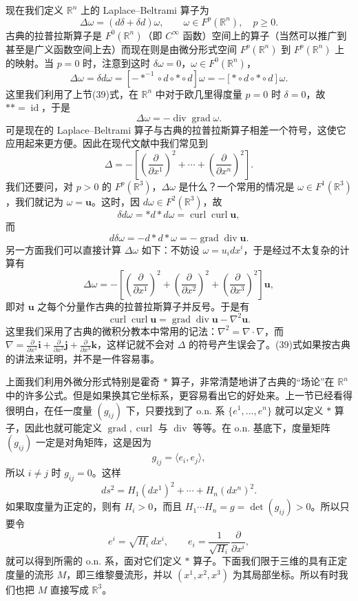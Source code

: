 现在我们定义 $\mathbb R^n$ 上的 Laplace--Beltrami 算子为
\begin{equation}
 \Delta\omega=(d\delta+\delta d)\omega,
 \qquad \omega\in F^p(\mathbb R^n),\quad p\ge0.
 \tag{38}
\end{equation}
古典的拉普拉斯算子是 $F^0(\mathbb R^n)$（即 $C^\infty$ 函数）空间上的算子（当然可以推广到甚至是广义函数空间上去）而现在则是由微分形式空间 $F^p(\mathbb R^n)$ 到 $F^p(\mathbb R^n)$ 上的映射。当 $p=0$ 时，注意到这时 $\delta\omega=0$，$\omega\in F^0(\mathbb R^n)$，
\[
 \Delta\omega=\delta d\omega=[-*^{-1}\circ d\circ *\circ d]\omega=-[*\circ d\circ *\circ d]\omega.
\]
这里我们利用了上节(39)式，在 $\mathbb R^n$ 中对于欧几里得度量 $p=0$ 时 $\delta=0$，故 $**=\operatorname{id}$，于是
\[
 \Delta\omega=-\operatorname{div}\operatorname{grad}\omega.
\]
可是现在的 Laplace--Beltrami 算子与古典的拉普拉斯算子相差一个符号，这使它应用起来更方便。因此在现代文献中我们常见到
\[
 \Delta=-\left[\left(\frac{\partial}{\partial x^1}\right)^2+\cdots+\left(\frac{\partial}{\partial x^n}\right)^2\right].
\]
我们还要问，对 $p>0$ 的 $F^p(\mathbb R^3)$，$\Delta\omega$ 是什么？一个常用的情况是 $\omega\in F^1(\mathbb R^3)$，我们就记为 $\omega=\mathbf u$。这时，因 $d\omega\in F^2(\mathbb R^3)$，故
\[
 \delta d\omega=*d*d\omega=\operatorname{curl}\operatorname{curl}\mathbf u,
\]
而
\[
 d\delta\omega=-d*d*\omega=-\operatorname{grad}\operatorname{div}\mathbf u.
\]
另一方面我们可以直接计算 $\Delta\omega$ 如下：不妨设 $\omega=u_i dx^i$，于是经过不太复杂的计算有
\[
 \Delta\omega=-\left[\left(\frac{\partial}{\partial x^1}\right)^2+\left(\frac{\partial}{\partial x^2}\right)^2+\left(\frac{\partial}{\partial x^3}\right)^2\right]\mathbf u,
\]
即对 $\mathbf u$ 之每个分量作古典的拉普拉斯算子并反号。于是有
\begin{equation}
 \operatorname{curl}\operatorname{curl}\mathbf u
 =\operatorname{grad}\operatorname{div}\mathbf u-\nabla^2\mathbf u.
 \tag{39}
\end{equation}
这里我们采用了古典的微积分教本中常用的记法：$\nabla^2=\nabla\cdot\nabla$，而 $\nabla=\frac{\partial}{\partial x^1}\mathbf i+\frac{\partial}{\partial x^2}\mathbf j+\frac{\partial}{\partial x^3}\mathbf k$，这样记就不会对 $\Delta$ 的符号产生误会了。(39)式如果按古典的讲法来证明，并不是一件容易事。

上面我们利用外微分形式特别是霍奇 $*$ 算子，非常清楚地讲了古典的“场论”在 $\mathbb R^n$ 中的许多公式。但是如果换其它坐标系，更容易看出它的好处来。上一节已经看得很明白，在任一度量 $(g_{ij})$ 下，只要找到了 o.n. 系 $\{e^1,\ldots,e^n\}$ 就可以定义 $*$ 算子，因此也就可能定义 $\operatorname{grad},\operatorname{curl}$ 与 $\operatorname{div}$ 等等。在 o.n. 基底下，度量矩阵 $(g_{ij})$ 一定是对角矩阵，这是因为
\[
 g_{ij}=\langle e_i,e_j\rangle,
\]
所以 $i\ne j$ 时 $g_{ij}=0$。这样
\begin{equation}
 ds^2=H_1(dx^1)^2+\cdots+H_n(dx^n)^2.
 \tag{40}
\end{equation}
如果取度量为正定的，则有 $H_i>0$，而且 $H_1\cdots H_n=g=\det(g_{ij})>0$。所以只要令
\[
 e^i=\sqrt{H_i}\,dx^i,
 \qquad e_i=\frac1{\sqrt{H_i}}\frac{\partial}{\partial x^i},
\]
就可以得到所需的 o.n. 系，面对它们定义 $*$ 算子。下面我们限于三维的具有正定度量的流形 $M$，即三维黎曼流形，并以 $(x^1,x^2,x^3)$ 为其局部坐标。所以有时我们也把 $M$ 直接写成 $\mathbb R^3$。

